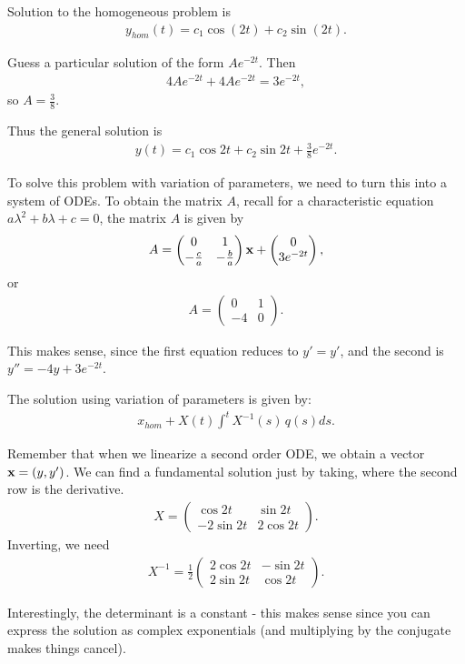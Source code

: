 \documentclass{article}
\newcommand{\mat}[1]{\begin{pmatrix}#1\end{pmatrix}}
\begin{document}
Solution to the homogeneous problem is
\begin{align*}
  y_{hom}(t) = c_1 \cos (2t) + c_2 \sin (2t).
\end{align*}

Guess a particular solution of the form $A e^{-2t}$.  Then
\begin{align*}
  4A e^{-2t} + 4 A e^{-2t} = 3 e^{-2t},
\end{align*}
so $A = \frac{3}{8}$.

Thus the general solution is
\begin{align*}
  y(t) = c_1 \cos 2t + c_2 \sin 2t + \frac{3}{8} e^{-2t}.
\end{align*}

To solve this problem with variation of parameters, we need to turn this into a system of ODEs.  To obtain the matrix $A$, recall for a characteristic equation $a\lambda^2 + b \lambda + c = 0$, the matrix $A$ is given by
\begin{align*}
  A = \mat{0 & 1 \\ - \frac{c}{a} & - \frac{b}{a}} \mbf{x} + \mat{0 \\ 3 e^{-2t}},
\end{align*}
or
\begin{align*}
  A = \mat{0 & 1 \\ -4 & 0}.
\end{align*}

This makes sense, since the first equation reduces to $y' = y'$, and the second is $y'' = -4y + 3 e^{-2t}$.

The solution using variation of parameters is given by:
\begin{align*}
  x_{hom} + X(t) \int^{t} X^{-1}(s) \, q(s) ds.
\end{align*}

Remember that when we linearize a second order ODE, we obtain a vector $\mathbf{x} = (y, y')$.  We can find a fundamental solution just by taking, where the second row is the derivative.
\begin{align*}
  X = \mat{\cos 2t & \sin 2t \\ - 2 \sin 2t & 2 \cos 2t}.
\end{align*}
Inverting, we need
\begin{align*}
  X^{-1} = \frac{1}{2} \mat{2 \cos 2t & - \sin 2t \\ 2 \sin 2t & \cos 2t}.
\end{align*}

Interestingly, the determinant is a constant - this makes sense since you can express the solution as complex exponentials (and multiplying by the conjugate makes things cancel).
\end{document}
